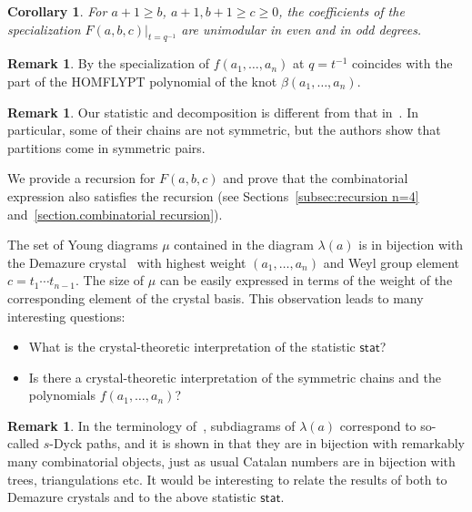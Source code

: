 \documentclass[11pt,reqno]{amsart}
\newcommand{\stat}{\mathsf{stat}}
\newtheorem{corollary}[theorem]{Corollary}
\theoremstyle{definition}
\newtheorem{remark}[theorem]{Remark}
\numberwithin{equation}{section}
\begin{document}
\begin{corollary}
For $a+1 \geqslant b$, $a+1,b+1 \geqslant c\geqslant 0$, the coefficients of the specialization
$F(a,b,c)|_{t=q^{-1}}$ are unimodular in even and in odd degrees. 
\end{corollary}

\begin{remark}
By \cite{GNR.2016,OR.2017} the specialization of $f(a_1,\ldots,a_n)$ at $q=t^{-1}$ coincides with the  part of the 
HOMFLYPT polynomial of the knot $\beta(a_1,\ldots,a_n)$. 
\end{remark}

\begin{remark}
Our statistic and decomposition is different from that in~\cite{LLL.2014, LLL.2018}. In particular, some of their chains 
are not symmetric, but the authors show that partitions come in symmetric pairs. 
\end{remark}

We provide a recursion for $F(a,b,c)$ and prove that the combinatorial expression also satisfies the recursion
(see Sections~\ref{subsec:recursion n=4} and~\ref{section.combinatorial recursion}).

The set of Young diagrams $\mu$ contained in the diagram $\lambda(a)$ is in bijection with the Demazure 
crystal~\cite{Kashiwara.1993,Littelmann.1995} with highest weight $(a_1,\ldots,a_n)$ and Weyl group element 
$c=t_1\cdots t_{n-1}$. The size of $\mu$ can be easily expressed in terms of the weight of the corresponding element 
of the crystal basis. This observation leads to many interesting questions:
\begin{itemize}
\item What is the crystal-theoretic interpretation of the statistic $\stat$? 
\item Is there a crystal-theoretic interpretation of the symmetric chains and the polynomials $f(a_1,\ldots,a_n)$?
\end{itemize}

\begin{remark}
In the terminology of~\cite{CDL.2018}, subdiagrams of $\lambda(a)$ correspond to so-called $s$-Dyck paths, and it is 
shown in \cite{CDL.2018} that they are in bijection with remarkably many combinatorial objects, just as usual Catalan 
numbers are in bijection with trees, triangulations etc. It would be interesting to relate the results of \cite{CDL.2018} 
both to Demazure crystals and to the above statistic  $\stat$.
\end{remark}
\end{document}

